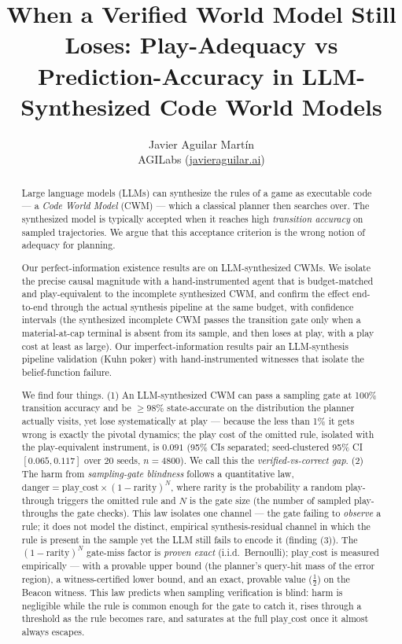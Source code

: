 \documentclass[11pt]{article}
\title{When a Verified World Model Still Loses: Play-Adequacy vs Prediction-Accuracy in LLM-Synthesized Code World Models}
\author{Javier Aguilar Mart\'in\\ AGILabs (\href{https://javieraguilar.ai}{javieraguilar.ai})}
\date{}
\theoremstyle{remark}
\begin{document}
\maketitle

\begin{abstract}
Large language models (LLMs) can synthesize the rules of a game as executable code --- a \emph{Code World Model} (CWM) --- which a classical planner then searches over. The synthesized model is typically accepted when it reaches high \emph{transition accuracy} on sampled trajectories. We argue that this acceptance criterion is the wrong notion of adequacy for planning.

Our perfect-information existence results are on LLM-synthesized CWMs. We isolate the precise causal magnitude with a hand-instrumented agent that is budget-matched and play-equivalent to the incomplete synthesized CWM, and confirm the effect end-to-end through the actual synthesis pipeline at the same budget, with confidence intervals (the synthesized incomplete CWM passes the transition gate only when a material-at-cap terminal is absent from its sample, and then loses at play, with a play cost at least as large). Our imperfect-information results pair an LLM-synthesis pipeline validation (Kuhn poker) with hand-instrumented witnesses that isolate the belief-function failure.

We find four things. (1) An LLM-synthesized CWM can pass a sampling gate at 100\% transition accuracy and be $\geq 98\%$ state-accurate on the distribution the planner actually visits, yet lose systematically at play --- because the less than 1\% it gets wrong is exactly the pivotal dynamics; the play cost of the omitted rule, isolated with the play-equivalent instrument, is $0.091$ (95\% CIs separated; seed-clustered 95\% CI $[0.065, 0.117]$ over 20 seeds, $n=4800$). We call this the \emph{verified-vs-correct gap}. (2) The harm from \emph{sampling-gate blindness} follows a quantitative law, $\mathrm{danger} = \mathrm{play\_cost} \times (1 - \mathrm{rarity})^N$, where $\mathrm{rarity}$ is the probability a random play-through triggers the omitted rule and $N$ is the gate size (the number of sampled play-throughs the gate checks). This law isolates one channel --- the gate failing to \emph{observe} a rule; it does not model the distinct, empirical synthesis-residual channel in which the rule is present in the sample yet the LLM still fails to encode it (finding (3)). The $(1 - \mathrm{rarity})^N$ gate-miss factor is \emph{proven exact} (i.i.d.\ Bernoulli); $\mathrm{play\_cost}$ is measured empirically --- with a provable upper bound (the planner's query-hit mass of the error region), a witness-certified lower bound, and an exact, provable value ($\tfrac12$) on the Beacon witness. This law predicts when sampling verification is blind: harm is negligible while the rule is common enough for the gate to catch it, rises through a threshold as the rule becomes rare, and saturates at the full $\mathrm{play\_cost}$ once it almost always escapes.


\end{abstract}
\end{document}
